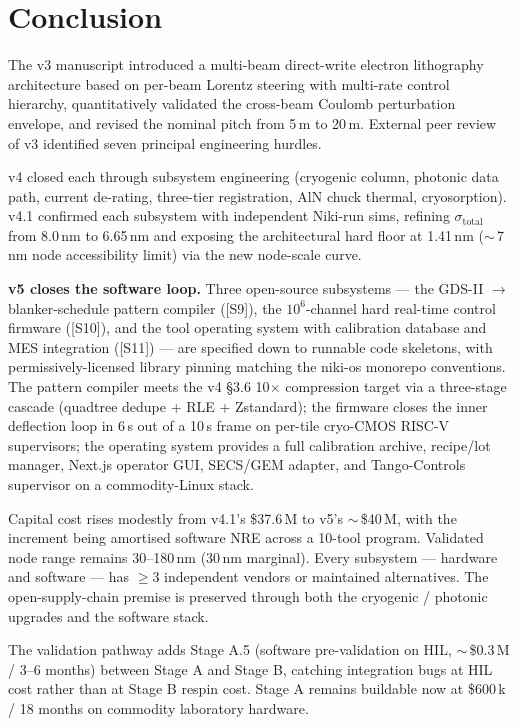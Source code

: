 \documentclass[11pt,letterpaper]{article}
\begin{document}
\section{Conclusion}

The v3 manuscript introduced a multi-beam direct-write electron lithography architecture based on per-beam Lorentz steering with multi-rate control hierarchy, quantitatively validated the cross-beam Coulomb perturbation envelope, and revised the nominal pitch from 5\,\textmu m to 20\,\textmu m. External peer review of v3 identified seven principal engineering hurdles.

v4 closed each through subsystem engineering (cryogenic column, photonic data path, current de-rating, three-tier registration, AlN chuck thermal, cryosorption). v4.1 confirmed each subsystem with independent Niki-run sims, refining $\sigma_\text{total}$ from 8.0\,nm to 6.65\,nm and exposing the architectural hard floor at 1.41\,nm ($\sim$\,7\,nm node accessibility limit) via the new node-scale curve.

\textbf{v5 closes the software loop.} Three open-source subsystems --- the GDS-II $\to$ blanker-schedule pattern compiler ([S9]), the $10^6$-channel hard real-time control firmware ([S10]), and the tool operating system with calibration database and MES integration ([S11]) --- are specified down to runnable code skeletons, with permissively-licensed library pinning matching the niki-os monorepo conventions. The pattern compiler meets the v4 \S 3.6 10$\times$ compression target via a three-stage cascade (quadtree dedupe + RLE + Zstandard); the firmware closes the inner deflection loop in 6\,\textmu s out of a 10\,\textmu s frame on per-tile cryo-CMOS RISC-V supervisors; the operating system provides a full calibration archive, recipe/lot manager, Next.js operator GUI, SECS/GEM adapter, and Tango-Controls supervisor on a commodity-Linux stack.

Capital cost rises modestly from v4.1's \$37.6\,M to v5's $\sim$\,\$40\,M, with the increment being amortised software NRE across a 10-tool program. Validated node range remains 30--180\,nm (30\,nm marginal). Every subsystem --- hardware and software --- has $\geq 3$ independent vendors or maintained alternatives. The open-supply-chain premise is preserved through both the cryogenic / photonic upgrades and the software stack.

The validation pathway adds Stage A.5 (software pre-validation on HIL, $\sim$\,\$0.3\,M / 3--6 months) between Stage A and Stage B, catching integration bugs at HIL cost rather than at Stage B respin cost. Stage A remains buildable now at \$600\,k / 18 months on commodity laboratory hardware.
\end{document}
